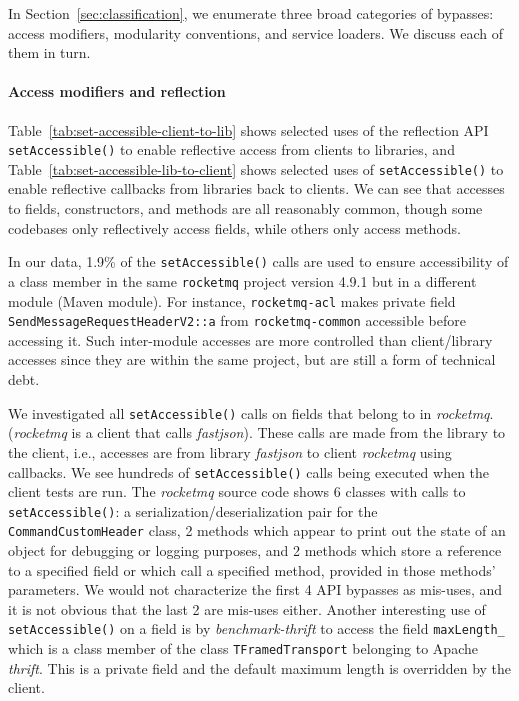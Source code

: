 In Section~\ref{sec:classification}, we enumerate three broad categories
of bypasses: access modifiers, modularity conventions, and service loaders. We discuss each of them in turn.


\paragraph{Access modifiers and reflection}


Table~\ref{tab:set-accessible-client-to-lib}
shows selected uses of the reflection API \texttt{setAccessible()} to enable reflective access from clients to libraries,
and Table~\ref{tab:set-accessible-lib-to-client} shows selected uses of \texttt{setAccessible()} to enable reflective callbacks from libraries back to clients.
We can see that accesses to fields, constructors, and methods are all reasonably common, though some codebases only reflectively 
access fields, while others only access methods.

In our data, 1.9\% of the \texttt{setAccessible()} calls are 
used to ensure accessibility of a class member
in the same \texttt{rocketmq} project version 4.9.1 but in a different module (Maven module). 
For instance, \texttt{rocketmq-acl} makes private field \texttt{SendMessageRequestHeaderV2::a} from 
\texttt{rocketmq-common} accessible before accessing it. Such inter-module accesses are more controlled than client/library accesses since they are within the same project,
but are still a form of technical debt.

We investigated all \texttt{setAccessible()} calls on fields that belong to in \emph{rocketmq}. (\emph{rocketmq} is a client that calls \emph{fastjson}). These calls are made from the library to the client, i.e., accesses are from library \emph{fastjson} to client \emph{rocketmq} using callbacks. We see hundreds of \texttt{setAccessible()} calls being executed when the client tests are run. The \emph{rocketmq} source code shows 6 classes with calls to \texttt{setAccessible()}: a serialization/deserialization pair for the \texttt{CommandCustomHeader} class, 2 methods which appear to print out the state of an object for debugging or logging purposes, and 2 methods which store a reference to a specified field or which call a specified method, provided in those methods' parameters. We would not characterize the first 4 API bypasses as mis-uses, and it is not obvious that the last 2 are mis-uses either. Another interesting use of \texttt{setAccessible()} on a field is by \emph{benchmark-thrift} to access the field \texttt{maxLength\_}  which is a class member of the class \texttt{TFramedTransport} belonging to Apache \emph{thrift}. This is a private field and the default maximum length is overridden by the client.

